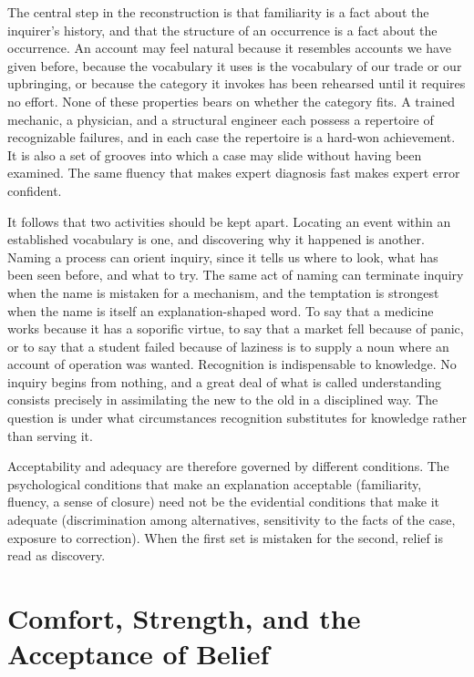\documentclass[11pt,letterpaper]{article}
\theoremstyle{definition}
\begin{document}
The central step in the reconstruction is that familiarity is a fact about the inquirer's history, and that the structure of an occurrence is a fact about the occurrence. An account may feel natural because it resembles accounts we have given before, because the vocabulary it uses is the vocabulary of our trade or our upbringing, or because the category it invokes has been rehearsed until it requires no effort. None of these properties bears on whether the category fits. A trained mechanic, a physician, and a structural engineer each possess a repertoire of recognizable failures, and in each case the repertoire is a hard-won achievement. It is also a set of grooves into which a case may slide without having been examined. The same fluency that makes expert diagnosis fast makes expert error confident.

It follows that two activities should be kept apart. Locating an event within an established vocabulary is one, and discovering why it happened is another. Naming a process can orient inquiry, since it tells us where to look, what has been seen before, and what to try. The same act of naming can terminate inquiry when the name is mistaken for a mechanism, and the temptation is strongest when the name is itself an explanation-shaped word. To say that a medicine works because it has a soporific virtue, to say that a market fell because of panic, or to say that a student failed because of laziness is to supply a noun where an account of operation was wanted. Recognition is indispensable to knowledge. No inquiry begins from nothing, and a great deal of what is called understanding consists precisely in assimilating the new to the old in a disciplined way. The question is under what circumstances recognition substitutes for knowledge rather than serving it.

Acceptability and adequacy are therefore governed by different conditions. The psychological conditions that make an explanation acceptable (familiarity, fluency, a sense of closure) need not be the evidential conditions that make it adequate (discrimination among alternatives, sensitivity to the facts of the case, exposure to correction). When the first set is mistaken for the second, relief is read as discovery.

\section{Comfort, Strength, and the Acceptance of Belief}
\end{document}
